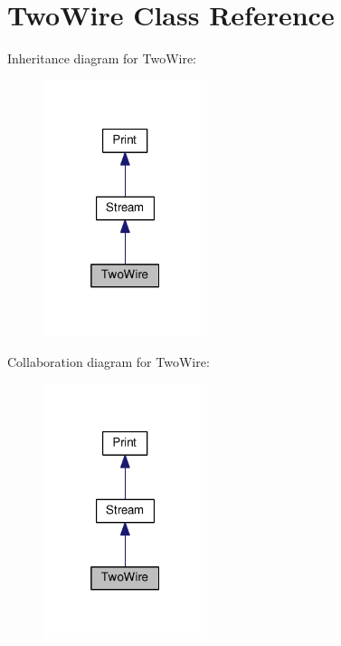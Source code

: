 \hypertarget{class_two_wire}{}\section{Two\+Wire Class Reference}
\label{class_two_wire}


Inheritance diagram for Two\+Wire\+:
\nopagebreak
\begin{figure}[H]
\begin{center}
\leavevmode
\includegraphics[width=136pt]{class_two_wire__inherit__graph}
\end{center}
\end{figure}


Collaboration diagram for Two\+Wire\+:
\nopagebreak
\begin{figure}[H]
\begin{center}
\leavevmode
\includegraphics[width=136pt]{class_two_wire__coll__graph}
\end{center}
\end{figure}
